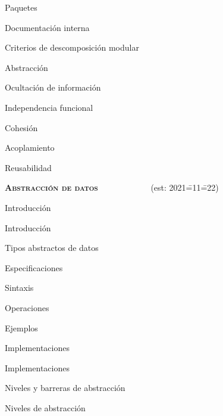 \begin{longenum}
\begin{longenum}
\begin{longenum}
            \item Paquetes \opcional\
            \item Documentación interna \opcional\
        \end{longenum}
        \item Criterios de descomposición modular
        \begin{longenum}
            \item Abstracción
            \item Ocultación de información
            \item Independencia funcional
            \begin{longenum}
                \item Cohesión
                \item Acoplamiento
            \end{longenum}
            \item Reusabilidad
        \end{longenum}
    \end{longenum}
    \item \textbf{\textsc{Abstracción de datos}} \ \ \ \ \ \ \ \ \ \ \ \ (est: 2021\==11\==22)
    \begin{longenum}
        \item Introducción
        \begin{longenum}
            \item Introducción
            \item Tipos abstractos de datos
        \end{longenum}
        \item Especificaciones
        \begin{longenum}
            \item Sintaxis
            \item Operaciones
            \item Ejemplos
        \end{longenum}
        \item Implementaciones
        \begin{longenum}
            \item Implementaciones
        \end{longenum}
        \item Niveles y barreras de abstracción
        \begin{longenum}
            \item Niveles de abstracción

\end{longenum}
\end{longenum}
\end{longenum}
